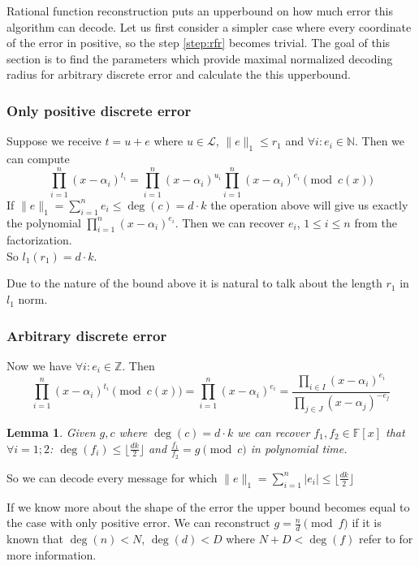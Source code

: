 \documentclass[12pt]{article}
\newcommand{\floor}[1]{\lfloor #1 \rfloor}
\newtheorem{lemma}{Lemma}
\begin{document}
Rational function reconstruction puts an upperbound on how much error this algorithm can decode. Let us first consider a simpler case where every coordinate of the error in positive, so the step \ref{step:rfr} becomes trivial. The goal of this section is to find the parameters which provide maximal normalized decoding radius for arbitrary discrete error and calculate the this upperbound.

\subsubsection{Only positive discrete error}
\label{subsubsec:positive_error}
Suppose we receive $t = u + e$ where $u \in \mathcal{L}$, $\|e\|_1 \leq r_1$ and $\forall i: e_i \in \mathbb{N}$. Then we can compute
\[
\prod_{i = 1}^{n}(x - \alpha_i)^{t_i} = \prod_{i = 1}^{n}(x - \alpha_i)^{u_i}\prod_{i = 1}^{n}(x - \alpha_i)^{e_i} \pmod{c(x)}
\]
If $\|e\|_1 = \sum_{i =1}^{n} e_i \leq \deg(c) = d \cdot k$ the operation above will give us exactly the polynomial $\prod_{i = 1}^{n}(x - \alpha_i)^{e_i}$. Then we can recover $e_i$, $1 \leq i \leq n$ from the factorization.\\
So $l_1(r_1) = d \cdot k$.

Due to the nature of the bound above it is natural to talk about the length $r_1$ in $l_1$ norm.


\subsubsection{Arbitrary discrete error}
\label{subsubsec:discrete_error}
Now we have $\forall i: e_i \in \mathbb{Z}$. Then
\[
\prod_{i = 1}^{n}(x - \alpha_i)^{t_i} \pmod{c(x)} = \prod_{i = 1}^{n}(x - \alpha_i)^{e_i} = \frac{\prod_{i \in I}(x - \alpha_i)^{e_i}}{\prod_{j \in J}(x - \alpha_j)^{-e_j}}
\]

\begin{lemma}
Given $g,c$ where $\deg(c) = d \cdot k$ we can recover $f_{1}, f_{2} \in \mathbb{F}[x]$ that  $\forall i = 1;2$: $\deg(f_{i}) \leq \floor{\frac{dk}{2}}$ and $\frac{f_{1}}{f_{2}} = g \pmod{c}$ in polynomial time.
\end{lemma}

So we can decode every message for which $\|e\|_1 = \sum_{i =1}^{n} |e_i| \leq \floor{\frac{dk}{2}}$

If we know more about the shape of the error the upper bound becomes equal to the case with only positive error. We can reconstruct $g = \frac{n}{d} \pmod{f}$ if it is known that $\deg(n) < N$, $\deg(d) < D$ where $N + D < \deg(f)$ refer to \cite{[KM06]} for more information.
\end{document}
